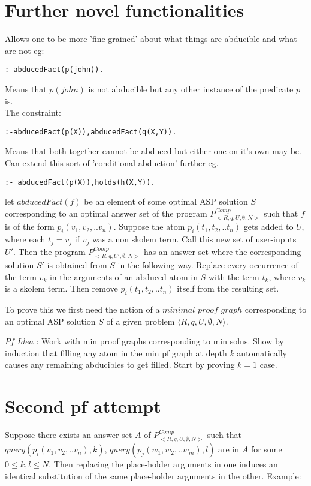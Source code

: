 \section{Further novel functionalities}
Allows one to be more 'fine-grained' about what things are abducible and what are not eg:
\begin{verbatim}
:-abducedFact(p(john)).    
\end{verbatim}
Means that $p(john)$ is not abducible but any other instance of the predicate $p$ is.\\
\newline
The constraint:
\begin{verbatim}
:-abducedFact(p(X)),abducedFact(q(X,Y)).
\end{verbatim}
Means that both together cannot be abduced but either one on it's own may be. Can extend this sort of 'conditional abduction' further eg.
\begin{verbatim}
:- abducedFact(p(X)),holds(h(X,Y)).  
\end{verbatim}


let $abducedFact(f)$ be an element of some optimal ASP solution $S$ corresponding to an optimal answer set of the program $P_{<R,q,U,\emptyset,N>}^{Comp}$ such that $f$ is of the form $p_{i}(v_{1},v_{2},..v_{n})$. Suppose the atom $p_{i}(t_{1},t_{2},..t_{n})$ gets added to $U$, where each $t_{j} = v_{j}$ if $v_{j}$ was a non skolem term. Call this new set of user-inputs $U'$. Then the program $P_{<R,q,U',\emptyset,N>}^{Comp}$ has an answer set where the corresponding solution $S'$ is obtained from $S$ in the following way. Replace every occurrence of the term $v_{k}$ in the arguments of an abduced atom in $S$ with the term $t_{k}$, where $v_{k}$ is a skolem term. Then remove $p_{i}(t_{1},t_{2},..t_{n})$ itself from the resulting set.

To prove this we first need the notion of a $minimal$ $proof$ $graph$ corresponding to an optimal ASP solution $S$ of a given problem $\langle R,q,U,\emptyset,N\rangle$.

$\textit{Pf Idea}$ : Work with min proof graphs corresponding to min solns. Show by induction that filling any atom in the min pf graph at depth $k$ automatically causes any remaining abducibles to get filled. Start by proving $k=1$ case.

\section{Second pf attempt}
Suppose there exists an answer set $A$ of $P_{<R,q,U,\emptyset,N>}^{Comp}$ such that $query(p_{i}(v_{1},v_{2},..v_{n}),k)$, $query(p_{j}(w_{1},w_{2},..w_{m}),l)$ are in $A$ for some $0\leq k, l \leq N$. Then replacing the place-holder arguments in one induces an identical substitution of the same place-holder arguments in the other. Example:

